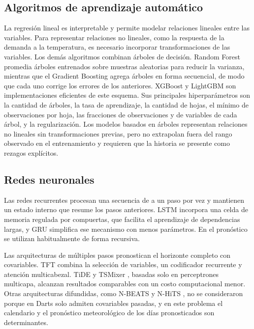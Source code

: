 \subsection{Algoritmos de aprendizaje automático}
\label{subsec:modelos_ml}

La regresión lineal es interpretable y permite modelar relaciones lineales entre las variables. Para representar relaciones no lineales, como la respuesta de la demanda a la temperatura, es necesario incorporar transformaciones de las variables. Los demás algoritmos combinan árboles de decisión. Random Forest \cite{breiman2001randomforest} promedia árboles entrenados sobre muestras aleatorias para reducir la varianza, mientras que el Gradient Boosting \cite{friedman2001gbm} agrega árboles en forma secuencial, de modo que cada uno corrige los errores de los anteriores. XGBoost \cite{chen2016xgboost} y LightGBM \cite{ke2017lightgbm} son implementaciones eficientes de este esquema. Sus principales hiperparámetros son la cantidad de árboles, la tasa de aprendizaje, la cantidad de hojas, el mínimo de observaciones por hoja, las fracciones de observaciones y de variables de cada árbol, y la regularización. Los modelos basados en árboles representan relaciones no lineales sin transformaciones previas, pero no extrapolan fuera del rango observado en el entrenamiento y requieren que la historia se presente como rezagos explícitos.

\subsection{Redes neuronales}
\label{subsec:modelos_rnn}
\label{subsec:modelos_multipaso}

Las redes recurrentes procesan una secuencia de a un paso por vez y mantienen un estado interno que resume los pasos anteriores. LSTM \cite{hochreiter1997lstm} incorpora una celda de memoria regulada por compuertas, que facilita el aprendizaje de dependencias largas, y GRU \cite{cho2014gru} simplifica ese mecanismo con menos parámetros. En el pronóstico se utilizan habitualmente de forma recursiva.

Las arquitecturas de múltiples pasos pronostican el horizonte completo con covariables. TFT \cite{lim2021tft} combina la selección de variables, un codificador recurrente y atención multicabezal. TiDE \cite{das2023tide} y TSMixer \cite{chen2023tsmixer}, basadas solo en perceptrones multicapa, alcanzan resultados comparables con un costo computacional menor. Otras arquitecturas difundidas, como N-BEATS \cite{oreshkin2020nbeats} y N-HiTS \cite{challu2023nhits}, no se consideraron porque en Darts solo admiten covariables pasadas, y en este problema el calendario y el pronóstico meteorológico de los días pronosticados son determinantes.

